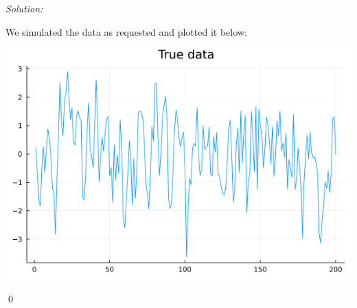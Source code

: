 \documentclass[12pt]{article}
\newenvironment{problem}[2][Problem]{\begin{trivlist}
\item[\hskip \labelsep {\bfseries #1}\hskip \labelsep {\bfseries #2.}]}{\end{trivlist}}
\newenvironment{sol}
    {\emph{Solution:}
    }
    {
    \qed
    }
\begin{document}
\begin{sol}
We simulated the data as requested and plotted it below:
    \begin{center}
        \includegraphics[scale=0.4]{x_plot.png}
    \end{center}
\end{sol}
\begin{problem}{4}
\end{problem}
\end{document}
